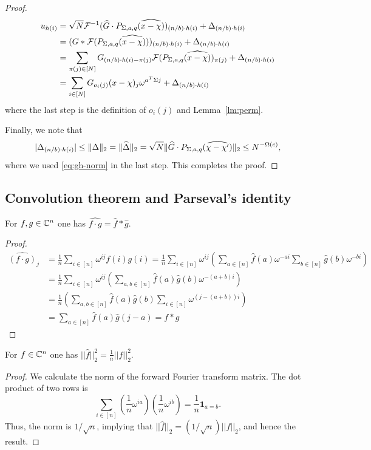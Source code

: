 \begin{proof}
  \begin{align*}
    u_{h(i)} &= \sqrt{N}\F^{-1}(\wh{G} \cdot P_{\Sigma, a, q}\wh{(x - \chi)})_{(n/b)\cdot h(i)} + \Delta_{(n/b)\cdot h(i)}\\
    &= (G * \F(P_{\Sigma, a, q}\wh{(x - \chi)}))_{(n/b)\cdot h(i)}+\Delta_{(n/b)\cdot h(i)}\\
    &= \sum_{\pi(j) \in [N]} G_{(n/b)\cdot h(i)-\pi(j)} \F(P_{\Sigma, a, q}\wh{(x - \chi)})_{\pi(j)}+\Delta_{(n/b)\cdot h(i)}\\
    &= \sum_{i \in [N]} G_{o_i(j)} (x - \chi)_{j} \omega^{a^T\Sigma j}+\Delta_{(n/b)\cdot h(i)}
  \end{align*}
  where the last step is the definition of $o_i(j)$ and Lemma~\ref{lm:perm}.
  
Finally, we note that 
\[
|\Delta_{(n/b)\cdot h(i)}|\leq \norm{2}{\Delta} =\norm{2}{\wh{\Delta}}=\sqrt{N}\norm{2}{\wh{G}\cdot P_{\Sigma, a, q}(\wh{\chi-\chi'})}\leq N^{-\Omega(c)},
\]
 where we used \eqref{eq:gh-norm} in the last step. This completes the proof.
\end{proof}


\subsection{Convolution theorem and Parseval's identity}
\begin{fact}\label{f:convolution}
For $f, g\in \C^n$ one has $\widehat{f\cdot g}=\widehat f * \widehat g$. 
\end{fact}
\begin{proof}
\begin{equation*}
\begin{split}
\widehat {(f\cdot g)}_{j}&=\frac1{n}\sum_{i\in [n]}  \omega^{ij} f(i)g(i)=\frac1{n}\sum_{i\in [n]}  \omega^{ij} \left(\sum_{a\in [n]}\hat f(a)\omega^{-ai}\sum_{b\in [n]}\hat g(b)\omega^{-bi}\right)\\
&=\frac1{n}\sum_{i\in [n]}  \omega^{ij} \left(\sum_{a, b\in [n]}\hat f(a) \hat g(b)\omega^{-(a+b)i}\right)\\
&=\frac1{n}\left(\sum_{a, b\in [n]}\hat f(a) \hat g(b)\sum_{i\in [n]}  \omega^{(j-(a+b))i}\right)\\
&=\sum_{a\in [n]}\hat f(a) \hat g(j-a)=f*g
\end{split}
\end{equation*}
\end{proof}

\begin{fact}\label{f:parseval}
For $f\in \C^n$ one has $||\widehat{f}||_2^2=\frac1{n}||f||_2^2$.
\end{fact}
\begin{proof}
We calculate the norm of the forward Fourier transform matrix. The dot product of two rows is
$$
\sum_{i\in [n]} \left(\frac1{n}\omega^{ia}\right)\left(\frac1{n}\omega^{ib}\right)=\frac1{n}\mathbf{1}_{a=b}.
$$
Thus, the norm is $1/\sqrt{n}$, implying that $||\widehat{f}||_2=(1/\sqrt{n}) ||f||_2$, and hence the result.
\end{proof}
\fi

